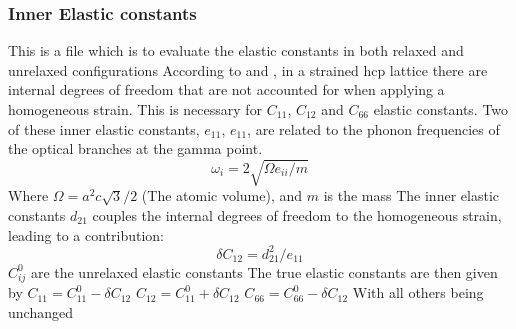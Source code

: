 \documentclass[11pt]{article}
\begin{document}
\subsubsection{Inner Elastic constants}
\label{sec:org1ce88fc}
This is a file which is to evaluate the elastic constants in both relaxed and unrelaxed configurations
According to \cite{Clouet2012} and \cite{Cousins1979}, in a strained hcp lattice there are internal degrees of freedom
that are not accounted for when applying a homogeneous strain.
This is necessary for \(C_{11}\), \(C_{12}\) and \(C_{66}\) elastic constants.
Two of these inner elastic constants, \(e_{11}\), \(e_{11}\), are related to the phonon frequencies of the optical branches at the gamma point.
\[\omega_i = 2  \sqrt{ \Omega  e_{ii} / m }\]
Where \(\Omega = a^2  c  \sqrt{3} / 2\) (The atomic volume), and \(m\) is the mass
The inner elastic constants \(d_{21}\) couples the internal degrees of freedom to the homogeneous strain, leading to a contribution:
\[\delta C_{12} = d_{21}^2 / e_{11}\]
\(C^0_{ij}\) are the unrelaxed elastic constants
The true elastic constants are then given by 
\(C_{11} = C^0_{11} - \delta C_{12}\) 
\(C_{12} = C^0_{11} + \delta C_{12}\) 
\(C_{66} = C^0_{66} - \delta C_{12}\) 
With all others being unchanged 
\end{document}
